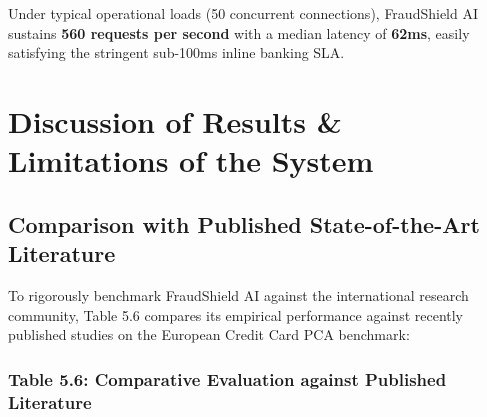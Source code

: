 \documentclass[12pt,a4paper,oneside]{report}
\begin{document}
Under typical operational loads (50 concurrent connections), FraudShield AI sustains \textbf{560 requests per second} with a median latency of \textbf{62ms}, easily satisfying the stringent sub-100ms inline banking SLA.



\section{Discussion of Results \& Limitations of the System}

\subsection{Comparison with Published State-of-the-Art Literature}

To rigorously benchmark FraudShield AI against the international research community, Table 5.6 compares its empirical performance against recently published studies on the European Credit Card PCA benchmark:


\subsubsection{Table 5.6: Comparative Evaluation against Published Literature}
\end{document}
